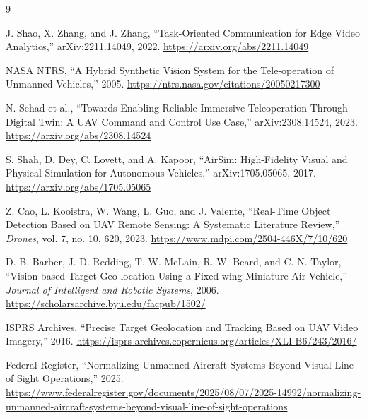 \documentclass[11pt,a4paper]{article}
\begin{document}
\begin{thebibliography}{9}

J. Shao, X. Zhang, and J. Zhang, ``Task-Oriented Communication for Edge Video Analytics,'' arXiv:2211.14049, 2022. \url{https://arxiv.org/abs/2211.14049}

NASA NTRS, ``A Hybrid Synthetic Vision System for the Tele-operation of Unmanned Vehicles,'' 2005. \url{https://ntrs.nasa.gov/citations/20050217300}

N. Sehad et al., ``Towards Enabling Reliable Immersive Teleoperation Through Digital Twin: A UAV Command and Control Use Case,'' arXiv:2308.14524, 2023. \url{https://arxiv.org/abs/2308.14524}

S. Shah, D. Dey, C. Lovett, and A. Kapoor, ``AirSim: High-Fidelity Visual and Physical Simulation for Autonomous Vehicles,'' arXiv:1705.05065, 2017. \url{https://arxiv.org/abs/1705.05065}

Z. Cao, L. Kooistra, W. Wang, L. Guo, and J. Valente, ``Real-Time Object Detection Based on UAV Remote Sensing: A Systematic Literature Review,'' \emph{Drones}, vol. 7, no. 10, 620, 2023. \url{https://www.mdpi.com/2504-446X/7/10/620}

D. B. Barber, J. D. Redding, T. W. McLain, R. W. Beard, and C. N. Taylor, ``Vision-based Target Geo-location Using a Fixed-wing Miniature Air Vehicle,'' \emph{Journal of Intelligent and Robotic Systems}, 2006. \url{https://scholarsarchive.byu.edu/facpub/1502/}

ISPRS Archives, ``Precise Target Geolocation and Tracking Based on UAV Video Imagery,'' 2016. \url{https://isprs-archives.copernicus.org/articles/XLI-B6/243/2016/}

Federal Register, ``Normalizing Unmanned Aircraft Systems Beyond Visual Line of Sight Operations,'' 2025. \url{https://www.federalregister.gov/documents/2025/08/07/2025-14992/normalizing-unmanned-aircraft-systems-beyond-visual-line-of-sight-operations}

\end{thebibliography}
\end{document}
